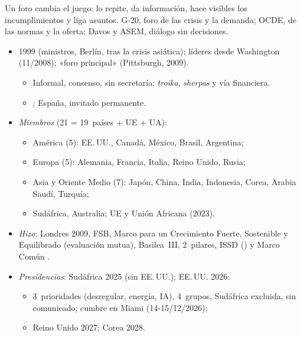 \documentclass{article}
\begin{document}
\begin{columnas}
\begin{ideaclave}
Un foro cambia el juego: lo repite, da información, hace visibles los incumplimientos y liga asuntos. G-20, foro de las crisis y la demanda; OCDE, de las normas y la oferta; Davos y ASEM, diálogo sin decisiones.
\end{ideaclave}
\begin{itemize}
\item 1999 (ministros, Berlín, tras la crisis asiática); líderes desde Washington (11/2008); «foro principal» (Pittsburgh, 2009).
  \begin{itemize}
  \item Informal, consenso, sin secretaría; \emph{troika}, \emph{sherpas} y vía financiera.
  \item {}; España, invitado permanente.
  \end{itemize}
\item \emph{Miembros} (21 = 19~países + UE + UA):
  \begin{itemize}
  \item América (5): EE.\,UU., Canadá, México, Brasil, Argentina;
  \item Europa (5): Alemania, Francia, Italia, Reino Unido, Rusia;
  \item Asia y Oriente Medio (7): Japón, China, India, Indonesia, Corea, Arabia Saudí, Turquía;
  \item Sudáfrica, Australia; UE y Unión Africana (2023).
  \end{itemize}
\item \emph{Hizo}: Londres 2009, FSB, Marco para un Crecimiento Fuerte, Sostenible y Equilibrado (evaluación mutua), Basilea~III, 2~pilares, ISSD () y Marco Común .
\item \emph{Presidencias}: Sudáfrica 2025 (sin EE.\,UU.); EE.\,UU. 2026:
  \begin{itemize}
  \item 3~prioridades (desregular, energía, IA), 4~grupos, Sudáfrica excluida, sin comunicado; cumbre en Miami (14-15/12/2026);
  \item Reino Unido 2027; Corea 2028.
  \end{itemize}
\end{itemize}

\end{columnas}
\end{document}
